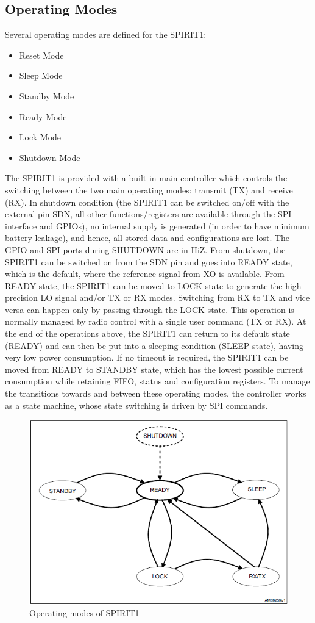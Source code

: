 \subsection{Operating Modes}
Several operating modes are defined for the SPIRIT1:
\begin{itemize}
	\item Reset Mode
	\item Sleep Mode
	\item Standby Mode
	\item Ready Mode
	\item Lock Mode
	\item Shutdown Mode
\end{itemize}
The SPIRIT1 is provided with a built-in main controller which controls the switching between the two main operating modes: transmit (TX) and receive (RX). In shutdown condition (the SPIRIT1 can be switched on/off with the external pin SDN, all other functions/registers are available through the SPI interface and GPIOs), no internal supply is generated (in order to have minimum battery leakage), and hence, all stored data and configurations are lost. The GPIO and SPI ports during SHUTDOWN are in HiZ. From shutdown, the SPIRIT1 can be switched on from the SDN pin and goes into READY state, which is the default, where the reference signal from XO is available. From READY state, the SPIRIT1 can be moved to LOCK state to generate the high precision LO signal and/or TX or RX modes. Switching from RX to TX and vice versa can happen only by passing through the LOCK state. This operation is normally managed by radio control with a single user command (TX or RX). At the end of the operations above, the SPIRIT1 can return to its default state (READY) and can then be put into a sleeping condition (SLEEP state), having very low power consumption. If no timeout is required, the SPIRIT1 can be moved from READY to STANDBY state, which has the lowest possible current consumption while retaining FIFO, status and configuration registers. To manage the transitions towards and between these operating modes, the controller works as a state machine, whose state switching is driven by SPI commands. \\
\begin{figure}[ht]
	\centering
	\includegraphics[scale=0.8]{images/modes.png}
	\caption{Operating modes of SPIRIT1}
\end{figure}

